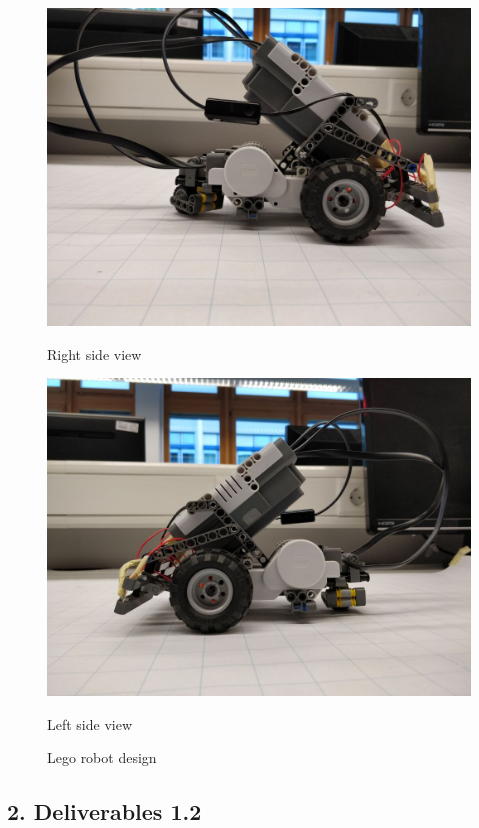 \documentclass[11pt,a4paper,openright,twoside]{extreport}
\begin{document}
\begin{figure}[ht]
\begin{minipage}[b]{0.5\textwidth}
    \centering
    \includegraphics[width=.9\textwidth]{rightSide.jpeg}
    \captionsetup{labelformat=empty}
    \caption{Right side view} 
    \vspace{4ex}
  \end{minipage}%
  \begin{minipage}[b]{0.5\textwidth}
    \centering
    \includegraphics[width=.9\textwidth]{leftSide.jpeg}
    \captionsetup{labelformat=empty}
    \caption{Left side view} 
    \vspace{4ex}
  \end{minipage}
\captionsetup{labelformat=empty}
\caption{Lego robot design}
\end{figure}

\newpage
\subsection*{2. Deliverables 1.2}
\end{document}
